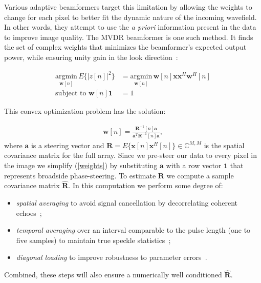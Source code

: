 \documentclass[10pt,journal,draftclsnofoot,onecolumn]{IEEEtran}
\newcommand\argmin[1]{\text{arg}\;\underset{#1}{\text{min}}}
\newcommand\T{^{\scriptscriptstyle T}}
\renewcommand\H{^{\scriptscriptstyle H}}
\renewcommand\vec[1]{\boldsymbol{#1}}
\newcommand\mat[1]{\boldsymbol{#1}}
\newcommand\1{\vec 1}
\renewcommand*\a{\vec a}
\newcommand*\w{\vec w}
\newcommand*\x{\vec x}
\newcommand*\R{\mat R}
\newcommand*\Ri{\R^{-1}}
\newcommand*\eR{\mat{\hat R}}
\renewcommand\argmin{\text{argmin}}
\begin{document}
Various adaptive beamformers target this limitation by allowing the weights to change for each pixel to better fit the dynamic nature of the incoming wavefield. In other words, they attempt to use the \emph{a priori} information present in the data to improve image quality. The MVDR beamformer is one such method. It finds the set of complex weights that minimizes the beamformer's expected output power, while ensuring unity gain in the look direction~\cite{Capon1969}:

\begin{align}
\underset{\w[n]}{\argmin}\, E\{|z[n]|^2\} &= \underset{\w[n]}{\argmin}\, \w[n]\x\x\H\w\H[n]\\
\text{subject to } \w[n]\1 &= 1
\end{align}

This convex optimization problem has the solution:

\begin{gather}
\vec w[n] = \frac{\Ri[n]\a}{\a\T\Ri[n]\a},\label{weights}
\end{gather}
where $\a$ is a steering vector and $\R=E\{\x[n]\x\H[n]\}\in\mathbb{C}^{M,M}$ is the spatial covariance matrix for the full array. Since we pre-steer our data to every pixel in the image we simplify (\ref{weights}) by substituting $\a$ with a row vector $\1$ that represents broadside phase-steering. To estimate $\R$ we compute a sample covariance matrix $\eR$. In this computation we perform some degree of:
\begin{itemize}
\item \emph{spatial averaging} to avoid signal cancellation by decorrelating coherent echoes~\cite{Kailath1985};
\item \emph{temporal averaging} over an interval comparable to the pulse length (one to five samples) to maintain true speckle statistics~\cite{Synnevag2009a};
\item \emph{diagonal loading} to improve robustness to parameter errors~\cite{Cox1987,Maksym1979}.
\end{itemize}%
%
%
Combined, these steps will also ensure a numerically well conditioned $\eR$.
\end{document}
